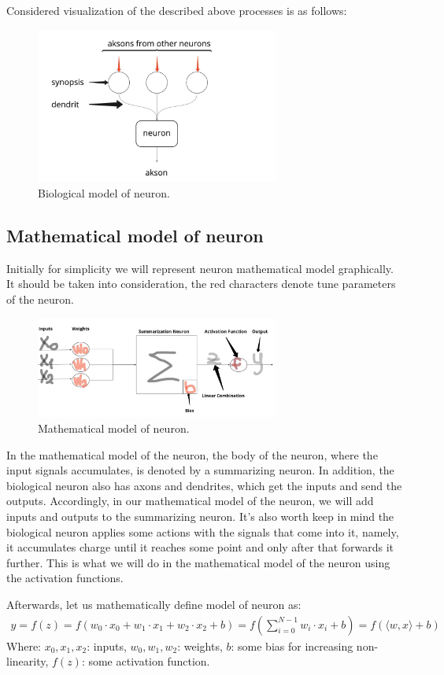 \documentclass{article}
\begin{document}
Considered visualization of the described above processes is as follows:
\begin{figure}[h]
    \centering \includegraphics[width=8cm]{images/biological_neuron.jpg}
    \caption {Biological model of neuron.}
\end{figure}    

\subsection{Mathematical model of neuron}
Initially for simplicity we will represent neuron mathematical model graphically. It should be taken into consideration, the red characters denote tune parameters of the neuron.     
\begin{figure}[h]
    \centering \includegraphics[width=8cm]{images/neuron_math_model.jpg}
    \caption {Mathematical model of neuron.}
\end{figure} 

In the mathematical model of the neuron, the body of the neuron, where the input signals accumulates, is denoted by a summarizing neuron. In addition, the biological neuron also has axons and dendrites, which get the inputs and send the outputs. Accordingly, in our mathematical model of the neuron, we will add inputs and outputs to the summarizing neuron. It's also worth keep in mind the biological neuron applies some actions with the signals that come into it, namely, it accumulates charge until it reaches some point and only after that forwards it further. This is what we will do in the mathematical model of the neuron using the activation functions.

Afterwards, let us mathematically define model of neuron as:
\begin{align*}
y = f(z) = f(w_0 \cdot x_0+w_1 \cdot x_1+w_2 \cdot x_2+b) = f(\sum\limits_{i=0}^{N-1} w_i \cdot x_i+b) = f(\langle w, x \rangle + b)
\end{align*}
Where: $x_0, x_1, x_2$: inputs, $w_0, w_1, w_2$: weights,  $b$: some bias for increasing non-linearity, $f(z)$: some activation function. 
\end{document}
